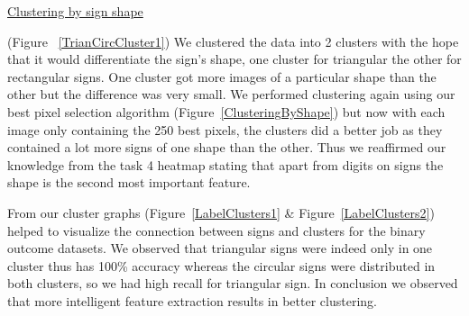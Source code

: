 \documentclass[11pt]{article}
\begin{document}
\underline{Clustering by sign shape}
\par
(Figure ~\ref{TrianCircCluster1}) We clustered the data into 2 clusters with the hope that it would differentiate the sign's shape, one cluster for triangular the other for rectangular signs. 
One cluster got more images of a particular shape than the other but the difference was very small.
We performed clustering again using our best pixel selection algorithm (Figure~\ref{ClusteringByShape}) but now with each image only containing the 250 best pixels, the clusters did a better job as they contained a lot more signs of one shape than the other. Thus we reaffirmed our knowledge from the task 4 heatmap stating that apart from digits on signs the shape is the second most important feature. 
\par
From our cluster graphs (Figure~\ref{LabelClusters1} \& Figure~\ref{LabelClusters2}) helped to visualize the connection between signs and clusters for the binary outcome datasets. We observed that triangular signs were indeed only in one cluster thus has 100\% accuracy whereas the circular signs were distributed in both clusters, so we had high recall for triangular sign. 
In conclusion we observed that more intelligent feature extraction results in better clustering. \\
\end{document}

